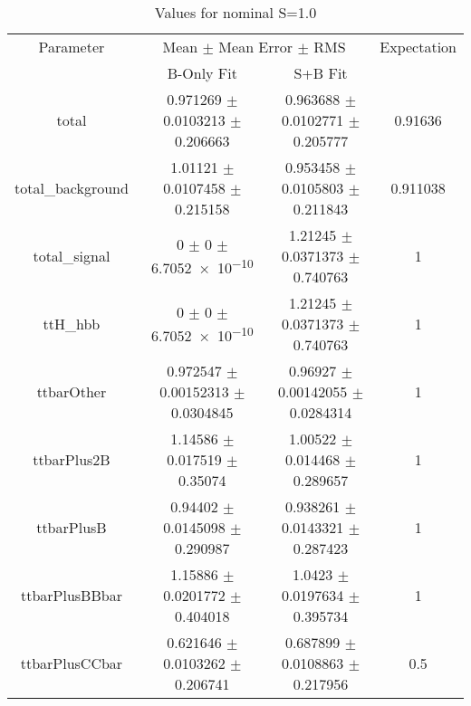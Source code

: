 \begin{table}
\centering
\caption{Values for nominal S=1.0}
\begin{tabular}{cccc}
\toprule
Parameter & \multicolumn{2}{c}{Mean $\pm$ Mean Error $\pm$ RMS} & Expectation\\
 & B-Only Fit & S+B Fit & \\
\midrule
total & \num{0.971269} $\pm$ \num{0.0103213} $\pm$ \num{0.206663} & \num{0.963688} $\pm$ \num{0.0102771} $\pm$ \num{0.205777} & \num{0.91636}\\
total\_background & \num{1.01121} $\pm$ \num{0.0107458} $\pm$ \num{0.215158} & \num{0.953458} $\pm$ \num{0.0105803} $\pm$ \num{0.211843} & \num{0.911038}\\
total\_signal & \num{0} $\pm$ \num{0} $\pm$ \num{6.7052e-10} & \num{1.21245} $\pm$ \num{0.0371373} $\pm$ \num{0.740763} & \num{1}\\
ttH\_hbb & \num{0} $\pm$ \num{0} $\pm$ \num{6.7052e-10} & \num{1.21245} $\pm$ \num{0.0371373} $\pm$ \num{0.740763} & \num{1}\\
ttbarOther & \num{0.972547} $\pm$ \num{0.00152313} $\pm$ \num{0.0304845} & \num{0.96927} $\pm$ \num{0.00142055} $\pm$ \num{0.0284314} & \num{1}\\
ttbarPlus2B & \num{1.14586} $\pm$ \num{0.017519} $\pm$ \num{0.35074} & \num{1.00522} $\pm$ \num{0.014468} $\pm$ \num{0.289657} & \num{1}\\
ttbarPlusB & \num{0.94402} $\pm$ \num{0.0145098} $\pm$ \num{0.290987} & \num{0.938261} $\pm$ \num{0.0143321} $\pm$ \num{0.287423} & \num{1}\\
ttbarPlusBBbar & \num{1.15886} $\pm$ \num{0.0201772} $\pm$ \num{0.404018} & \num{1.0423} $\pm$ \num{0.0197634} $\pm$ \num{0.395734} & \num{1}\\
ttbarPlusCCbar & \num{0.621646} $\pm$ \num{0.0103262} $\pm$ \num{0.206741} & \num{0.687899} $\pm$ \num{0.0108863} $\pm$ \num{0.217956} & \num{0.5}\\
\bottomrule
\end{tabular}
\end{table}